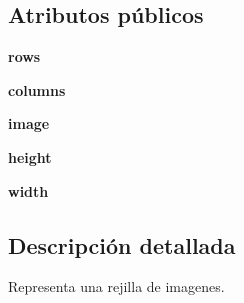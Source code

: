 \subsection*{\-Atributos públicos}
\begin{DoxyCompactItemize}
\item 
\hypertarget{classengine_1_1animation_1_1ImageGrid_a51ca371e8da0b45dcc798fd8feb90d08}{
{\bfseries rows}}
\label{classengine_1_1animation_1_1ImageGrid_a51ca371e8da0b45dcc798fd8feb90d08}

\item 
\hypertarget{classengine_1_1animation_1_1ImageGrid_ad0a93d93c43e25dc513521a56bb305fc}{
{\bfseries columns}}
\label{classengine_1_1animation_1_1ImageGrid_ad0a93d93c43e25dc513521a56bb305fc}

\item 
\hypertarget{classengine_1_1animation_1_1ImageGrid_a150a5255d2cb7a089052b7dd5ef52508}{
{\bfseries image}}
\label{classengine_1_1animation_1_1ImageGrid_a150a5255d2cb7a089052b7dd5ef52508}

\item 
\hypertarget{classengine_1_1animation_1_1ImageGrid_a5cd92cd62ad097547f5068d5adfc27a4}{
{\bfseries height}}
\label{classengine_1_1animation_1_1ImageGrid_a5cd92cd62ad097547f5068d5adfc27a4}

\item 
\hypertarget{classengine_1_1animation_1_1ImageGrid_a6396ae083cb288d8a712477b0c1fb379}{
{\bfseries width}}
\label{classengine_1_1animation_1_1ImageGrid_a6396ae083cb288d8a712477b0c1fb379}

\end{DoxyCompactItemize}


\subsection{\-Descripción detallada}
\-Representa una rejilla de imagenes. 


